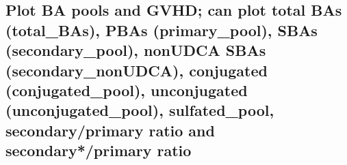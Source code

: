 \documentclass[
]{book}
\begin{document}
\hypertarget{plot-ba-pools-and-gvhd-can-plot-total-bas-total_bas-pbas-primary_pool-sbas-secondary_pool-nonudca-sbas-secondary_nonudca-conjugated-conjugated_pool-unconjugated-unconjugated_pool-sulfated_pool-secondaryprimary-ratio-and-secondaryprimary-ratio}{%
\subsection{Plot BA pools and GVHD; can plot total BAs (total\_BAs), PBAs (primary\_pool), SBAs (secondary\_pool), nonUDCA SBAs (secondary\_nonUDCA), conjugated (conjugated\_pool), unconjugated (unconjugated\_pool), sulfated\_pool, secondary/primary ratio and secondary*/primary ratio}\label{plot-ba-pools-and-gvhd-can-plot-total-bas-total_bas-pbas-primary_pool-sbas-secondary_pool-nonudca-sbas-secondary_nonudca-conjugated-conjugated_pool-unconjugated-unconjugated_pool-sulfated_pool-secondaryprimary-ratio-and-secondaryprimary-ratio}}
\end{document}

